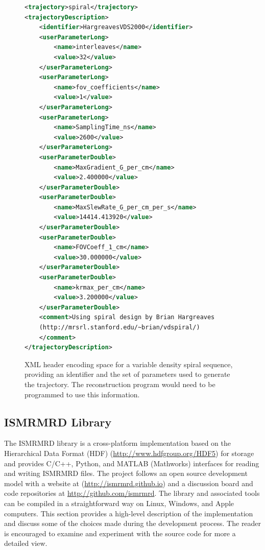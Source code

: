 \documentclass[12pt, draft]{article}
\newcommand{\madded}[2][None]{\added[remark=#1]{#2}}
\begin{document}
\begin{figure}
\begin{center}
\begin{lstlisting}[language=XML, frame=BT, framesep=10pt, basicstyle=\small]
<trajectory>spiral</trajectory>
<trajectoryDescription>
    <identifier>HargreavesVDS2000</identifier>
    <userParameterLong>
        <name>interleaves</name>
        <value>32</value>
    </userParameterLong>
    <userParameterLong>
        <name>fov_coefficients</name>
        <value>1</value>
    </userParameterLong>
    <userParameterLong>
        <name>SamplingTime_ns</name>
        <value>2600</value>
    </userParameterLong>
    <userParameterDouble>
        <name>MaxGradient_G_per_cm</name>
        <value>2.400000</value>
    </userParameterDouble>
    <userParameterDouble>
        <name>MaxSlewRate_G_per_cm_per_s</name>
        <value>14414.413920</value>
    </userParameterDouble>
    <userParameterDouble>
        <name>FOVCoeff_1_cm</name>
        <value>30.000000</value>
    </userParameterDouble>
    <userParameterDouble>
        <name>krmax_per_cm</name>
        <value>3.200000</value>
    </userParameterDouble>
    <comment>Using spiral design by Brian Hargreaves 
    (http://mrsrl.stanford.edu/~brian/vdspiral/)
    </comment>
</trajectoryDescription>
\end{lstlisting}
\caption{XML header encoding space for a variable density spiral sequence, providing an identifier and the set of parameters used to generate the trajectory.  The reconstruction program would need to be programmed to use this information.}
\label{fig:spiralxml}
\end{center}
\end{figure}

\subsection*{ISMRMRD Library}
The ISMRMRD library is a cross-platform implementation based on the \madded[R2.18]{domain-independent} Hierarchical Data Format (HDF) (\url{http://www.hdfgroup.org/HDF5}) for storage and provides C/C++, Python, and MATLAB (Mathworks) interfaces for reading and writing ISMRMRD files.  The project follows an open source development model with a website at (\url{http://ismrmrd.github.io}) and a discussion board and code repositories at \url{http://github.com/ismrmrd}.  The library and associated tools can be compiled in a straightforward way on Linux, Windows, and Apple computers.  This section provides a high-level description of the implementation and discuss some of the choices made during the development process.  The reader is encouraged to examine and experiment with the source code for more a detailed view.
\end{document}
